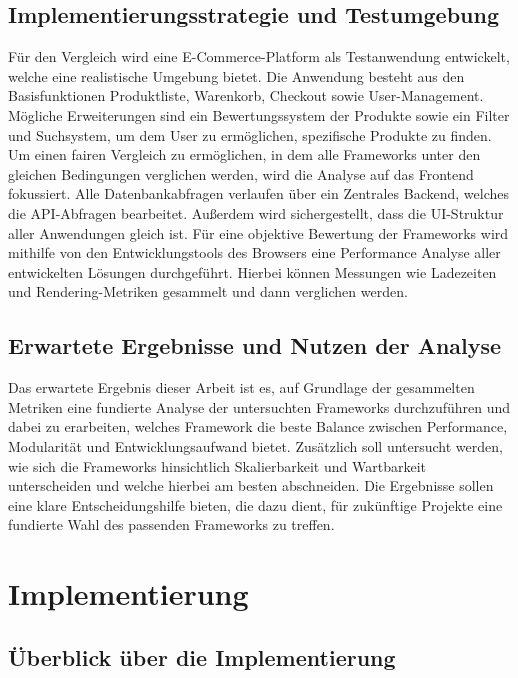 \documentclass[oneside]{ausarbeitung}
\begin{document}
\section{Implementierungsstrategie und Testumgebung}

Für den Vergleich wird eine E-Commerce-Platform als Testanwendung entwickelt, welche eine realistische Umgebung bietet. Die Anwendung besteht aus den Basisfunktionen Produktliste, Warenkorb, Checkout sowie User-Management. Mögliche Erweiterungen sind ein Bewertungssystem der Produkte sowie ein Filter und Suchsystem, um dem User zu ermöglichen, spezifische Produkte zu finden. 
Um einen fairen Vergleich zu ermöglichen, in dem alle Frameworks unter den gleichen Bedingungen verglichen werden, wird die Analyse auf das Frontend fokussiert. Alle Datenbankabfragen verlaufen über ein Zentrales Backend, welches die API-Abfragen bearbeitet. 
Außerdem wird sichergestellt, dass die UI-Struktur aller Anwendungen gleich ist. 
Für eine objektive Bewertung der Frameworks wird mithilfe von den Entwicklungstools des Browsers eine Performance Analyse aller entwickelten Lösungen durchgeführt. Hierbei können Messungen wie Ladezeiten und Rendering-Metriken gesammelt und dann verglichen werden. 

\section{Erwartete Ergebnisse und Nutzen der Analyse}

Das erwartete Ergebnis dieser Arbeit ist es, auf Grundlage der gesammelten Metriken eine fundierte Analyse der untersuchten Frameworks durchzuführen und dabei zu erarbeiten, welches Framework die beste Balance zwischen Performance, Modularität und Entwicklungsaufwand bietet.
Zusätzlich soll untersucht werden, wie sich die Frameworks hinsichtlich Skalierbarkeit und Wartbarkeit unterscheiden und welche hierbei am besten abschneiden.
Die Ergebnisse sollen eine klare Entscheidungshilfe bieten, die dazu dient, für zukünftige Projekte eine fundierte Wahl des passenden Frameworks zu treffen.

\chapter{Implementierung}
\label{cha:implementierung}

\section{Überblick über die Implementierung}
\end{document}
